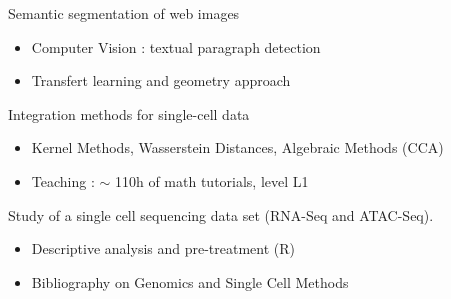\documentclass[10pt,a4paper]{fonteCVenglish}
\begin{document}




\begin{fullwidth}
\makecvheader
\end{fullwidth}





Semantic segmentation of web images
\smallskip
\begin{itemize}
\item Computer Vision : textual paragraph detection 
\item Transfert learning and geometry approach
\end{itemize}

\divider


 Integration methods for single-cell data
\smallskip
\begin{itemize}
    \item Kernel Methods, Wasserstein Distances, Algebraic Methods (CCA)
    \item Teaching : $\sim$ 110h of math tutorials, level L1
\end{itemize}

\divider

Study of a single cell sequencing data set (RNA-Seq and ATAC-Seq). 
\smallskip
\begin{itemize}
    \item Descriptive analysis and pre-treatment (R) 
    \item Bibliography on Genomics and Single Cell Methods
\end{itemize}
\smallskip
\end{document}
